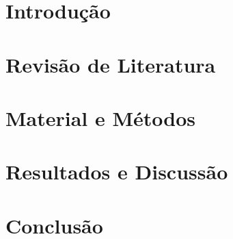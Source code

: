 \documentclass[
	12pt,				%
	openright,			%
	oneside,			%
	a4paper,			%
	brazil				%
	]{abntex2}
\begin{document}
\textual


\chapter{Introdução} 
\label{chap:introducao}


\chapter{Revisão de Literatura} 
\label{chap:revi}


\chapter{Material e Métodos} 
\label{chap:mati}


\chapter{Resultados e Discussão} 
\label{chap:resul}


\chapter{Conclusão} 
\label{chap:conc}



\end{document}
